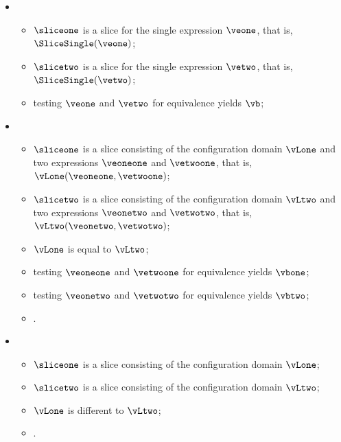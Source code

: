 \ProseParagraph
\OneApplies
\begin{itemize}
  \item {}
  \begin{itemize}
    \item $\sliceone$ is a slice for the single expression $\veone$, that is, $\SliceSingle(\veone)$;
    \item $\slicetwo$ is a slice for the single expression $\vetwo$, that is, $\SliceSingle(\vetwo)$;
    \item testing $\veone$ and $\vetwo$ for equivalence yields $\vb$\ProseOrTypeError;
  \end{itemize}

  \item {}
  \begin{itemize}
    \item $\sliceone$ is a slice consisting of the configuration domain $\vLone$ and two expressions $\veoneone$ and $\vetwoone$, that is, $\vLone(\veoneone, \vetwoone)$;
    \item $\slicetwo$ is a slice consisting of the configuration domain $\vLtwo$ and two expressions $\veonetwo$ and $\vetwotwo$, that is, $\vLtwo(\veonetwo, \vetwotwo)$;
    \item $\vLone$ is equal to $\vLtwo$;
    \item testing $\veoneone$ and $\vetwoone$ for equivalence yields $\vbone$\ProseOrTypeError;
    \item testing $\veonetwo$ and $\vetwotwo$ for equivalence yields $\vbtwo$\ProseOrTypeError;
    \item {}.
  \end{itemize}

  \item {}
  \begin{itemize}
    \item $\sliceone$ is a slice consisting of the configuration domain $\vLone$;
    \item $\slicetwo$ is a slice consisting of the configuration domain $\vLtwo$;
    \item $\vLone$ is different to $\vLtwo$;
    \item \Proseeqdef{$\vb$}{$\False$}.
  \end{itemize}
\end{itemize}

\FormallyParagraph
\begin{mathpar}
\end{mathpar}

